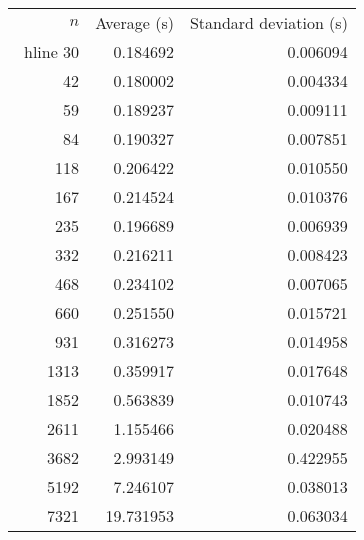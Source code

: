 \begin{tabular}{rrr}
$n$& Average (s) & Standard deviation (s)\\\ hline
30& 0.184692& 0.006094\\
42& 0.180002& 0.004334\\
59& 0.189237& 0.009111\\
84& 0.190327& 0.007851\\
118& 0.206422& 0.010550\\
167& 0.214524& 0.010376\\
235& 0.196689& 0.006939\\
332& 0.216211& 0.008423\\
468& 0.234102& 0.007065\\
660& 0.251550& 0.015721\\
931& 0.316273& 0.014958\\
1313& 0.359917& 0.017648\\
1852& 0.563839& 0.010743\\
2611& 1.155466& 0.020488\\
3682& 2.993149& 0.422955\\
5192& 7.246107& 0.038013\\
7321& 19.731953& 0.063034\\
\end{tabular}
